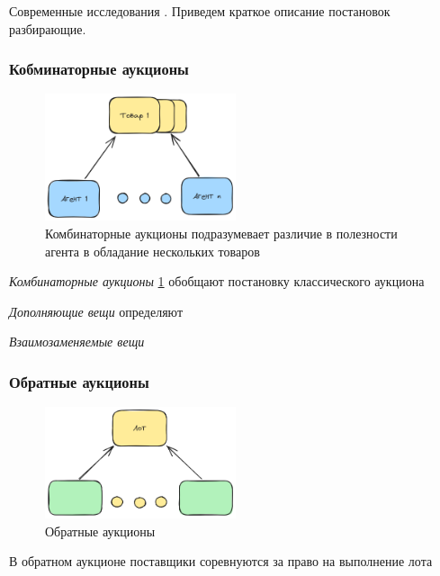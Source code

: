 
Современные исследования . Приведем краткое описание постановок разбирающие.

\subsubsection{Кобминаторные аукционы}

\begin{figure}[h]
    \centering
\includegraphics[width=0.5\textwidth]{assets/auctions/combinatorial.excalidraw.png}
    \caption{Комбинаторные аукционы подразумевает различие в полезности агента в обладание нескольких товаров}
    \label{сombinatorial}
\end{figure}

\textit{Комбинаторные аукционы} \ref{сombinatorial} обобщают постановку классического аукциона

    
\textit{Дополняющие вещи} определяют

\textit{Взаимозаменяемые вещи}


\subsubsection{Обратные аукционы}


\begin{figure}[h]
    \centering
\includegraphics[width=0.5\textwidth]{assets/auctions/reversed.excalidraw.png}
    \caption{Обратные аукционы}
    \label{reversed}
\end{figure}

В обратном аукционе поставщики соревнуются за право на выполнение лота



